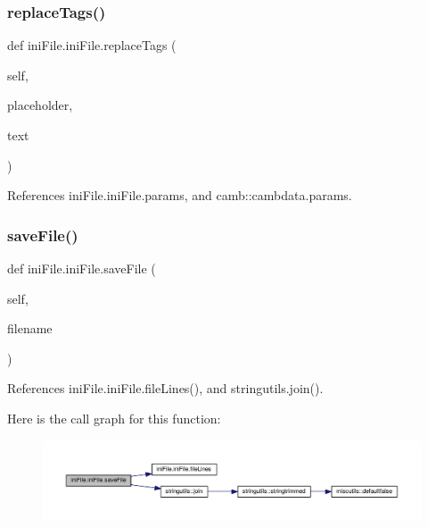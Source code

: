 \subsubsection{\texorpdfstring{replace\+Tags()}{replaceTags()}}
{\footnotesize\ttfamily def ini\+File.\+ini\+File.\+replace\+Tags (\begin{DoxyParamCaption}\item[{}]{self,  }\item[{}]{placeholder,  }\item[{}]{text }\end{DoxyParamCaption})}



References ini\+File.\+ini\+File.\+params, and camb\+::cambdata.\+params.

\mbox{\label{classiniFile_1_1iniFile_aa1ad88973b6e0d72d2eb0bd4ca865206}} 
\subsubsection{\texorpdfstring{save\+File()}{saveFile()}}
{\footnotesize\ttfamily def ini\+File.\+ini\+File.\+save\+File (\begin{DoxyParamCaption}\item[{}]{self,  }\item[{}]{filename }\end{DoxyParamCaption})}



References ini\+File.\+ini\+File.\+file\+Lines(), and stringutils.\+join().

Here is the call graph for this function\+:
\nopagebreak
\begin{figure}[H]
\begin{center}
\leavevmode
\includegraphics[width=350pt]{classiniFile_1_1iniFile_aa1ad88973b6e0d72d2eb0bd4ca865206_cgraph}
\end{center}
\end{figure}
\mbox{\label{classiniFile_1_1iniFile_a1ecee7d1dc8b4265f09528e0680cffe8}} 
